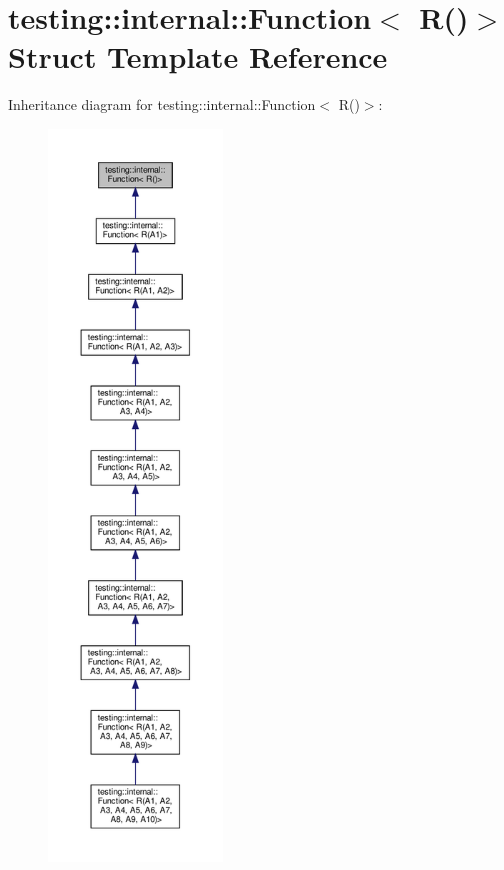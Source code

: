 \hypertarget{structtesting_1_1internal_1_1_function_3_01_r_07_08_4}{}\section{testing\+:\+:internal\+:\+:Function$<$ R()$>$ Struct Template Reference}
\label{structtesting_1_1internal_1_1_function_3_01_r_07_08_4}


Inheritance diagram for testing\+:\+:internal\+:\+:Function$<$ R()$>$\+:
\nopagebreak
\begin{figure}[H]
\begin{center}
\leavevmode
\includegraphics[height=550pt]{structtesting_1_1internal_1_1_function_3_01_r_07_08_4__inherit__graph}
\end{center}
\end{figure}
